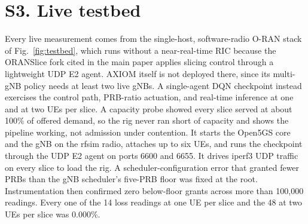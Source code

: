 \documentclass[9pt]{extarticle}
\begin{document}
\section*{S3. Live testbed}
Every live measurement comes from the single-host, software-radio O-RAN stack of Fig.~\ref{fig:testbed}, which runs without a near-real-time RIC because the ORANSlice fork cited in the main paper applies slicing control through a lightweight UDP E2 agent. AXIOM itself is not deployed there, since its multi-gNB policy needs at least two live gNBs. A single-agent DQN checkpoint instead exercises the control path, PRB-ratio actuation, and real-time inference at one and at two UEs per slice. A capacity probe showed every slice served at about 100\% of offered demand, so the rig never ran short of capacity and shows the pipeline working, not admission under contention. It starts the Open5GS core and the gNB on the rfsim radio, attaches up to six UEs, and runs the checkpoint through the UDP E2 agent on ports 6600 and 6655. It drives iperf3 UDP traffic on every slice to load the rig. A scheduler-configuration error that granted fewer PRBs than the gNB scheduler's five-PRB floor was fixed at the root. Instrumentation then confirmed zero below-floor grants across more than 100{,}000 readings. Every one of the 14 loss readings at one UE per slice and the 48 at two UEs per slice was 0.000\%.
\end{document}
